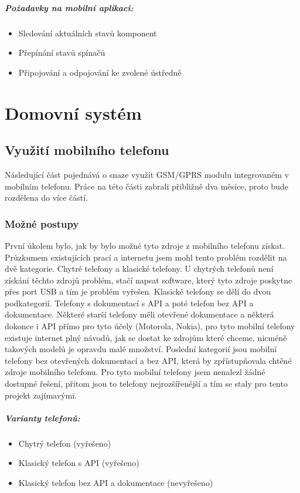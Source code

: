 \documentclass[FM,DP]{tulthesis}  %
\begin{document}
\paragraph{Požadavky na mobilní aplikaci:}
\begin{itemize}
\item Sledování aktuálních stavů komponent
\item Přepínání stavů spínačů
\item Připojování a odpojování ke zvolené ústředně
\end{itemize} 


\chapter{Domovní systém}

\section{Využití mobilního telefonu}
Následující část pojednává o snaze využít GSM/GPRS modulu integrovaném v mobilním telefonu. Práce na této části zabrali přibližně dva měsíce, proto bude rozdělena do více částí.

\subsection{Možné postupy}
První úkolem bylo, jak by bylo možné tyto zdroje z mobilního telefonu získat. Průzkumem existujících prací a internetu jsem mohl tento problém rozdělit na dvě kategorie. Chytré telefony a klasické telefony. U chytrých telefonů není získání těchto zdrojů problém, stačí napsat software, který tyto zdroje poskytne přes port USB a tím je problém vyřešen. Klasické telefony se dělí do dvou podkategorií. Telefony s dokumentací s API a poté telefon bez API a dokumentace. Některé starší telefony měli otevřené dokumentace a některá dokonce i API přímo pro tyto účely (Motorola, Nokia), pro tyto mobilní telefony existuje internet plný návodů, jak se dostat ke zdrojům které chceme, nicméně takových modelů je opravdu malé množství. Poslední kategorií jsou mobilní telefony bez otevřených dokumentací a bez API, která by zpřístupňovala chtěné zdroje mobilního telefonu. Pro tyto mobilní telefony jsem nenalezl žádné dostupné řešení, přitom jsou to telefony nejrozšířenější a tím se staly pro tento projekt zajímavými.

\paragraph{Varianty telefonů:}
\begin{itemize}
\item Chytrý telefon (vyřešeno)
\item Klasický telefon s API (vyřešeno)
\item Klasický telefon bez API a dokumentace (nevyřešeno)
\end{itemize} 
\end{document}
